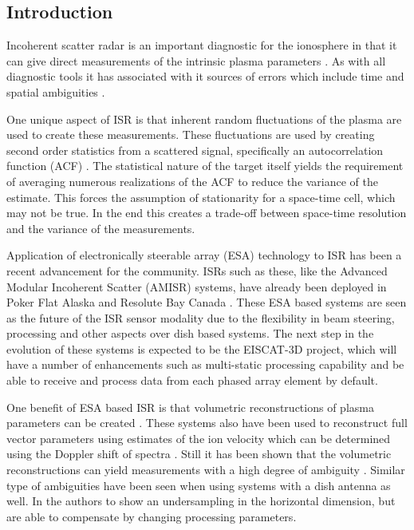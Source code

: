\documentclass[draft,ras]{agutex}
\begin{document}
%

\begin{article}

\section{Introduction}
Incoherent scatter radar is an important diagnostic for the ionosphere in that it can give direct measurements of the intrinsic plasma parameters  \citep{dougherty:farley1960, farleydougherty:ISR2, doughteryfarley:ISR3, hagfors1961}. As with all diagnostic tools it has associated with it sources of errors which include time and spatial ambiguities \citep{farley1969, farleycomppower1969, hysell2008, RDS:RDS20236}.  

One unique aspect of ISR is that inherent random fluctuations of the plasma are used to create these measurements. These fluctuations are used by creating second order statistics from a scattered signal, specifically an autocorrelation function (ACF) \citep{farley1969}. The statistical nature of the target itself yields the requirement of averaging numerous realizations of the ACF to reduce the variance of the estimate. This forces the assumption of stationarity for a space-time cell, which may not be true. In the end this creates a trade-off between space-time resolution and the variance of the measurements.

Application of electronically steerable array (ESA) technology to ISR has been a recent advancement for the community. ISRs such as these, like the Advanced Modular Incoherent Scatter (AMISR) systems, have already been deployed in Poker Flat Alaska and Resolute Bay Canada \citep{Nicolls:2007ie, dahlgren2012di}. These ESA based systems are seen as the future of the ISR sensor modality due to the flexibility in beam steering, processing and other aspects over dish based systems. The next step in the evolution of these systems is expected to be the EISCAT-3D project, which will have a number of enhancements such as multi-static processing capability and be able to receive and process data from each phased array element by default.

One benefit of ESA based ISR is that volumetric reconstructions of plasma parameters can be created \citep{Semeter2009738, Nicolls:2007ie, dahlgren2012di}. These systems also have been used to reconstruct full vector parameters using estimates of the ion velocity which can be determined using the Doppler shift of spectra \citep{butler:imagingfregiondrifts,RDS:RDS20195}. Still it has been shown that the volumetric reconstructions can yield measurements with a high degree of ambiguity \citep{Dahlgren:2012dq}. Similar type of ambiguities have been seen when using systems with a dish antenna as well. In \citet{Semeter:2005fo} the authors to show an undersampling in the horizontal dimension, but are able to compensate by changing processing parameters.


\end{article}
\end{document}
